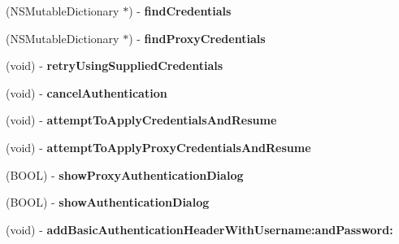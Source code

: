\begin{DoxyCompactItemize}
\item 
\hypertarget{interface_a_s_i_h_t_t_p_request_af337cbd50189506479260c6069ca2ded}{
(\-N\-S\-Mutable\-Dictionary $\ast$) -\/ {\bfseries find\-Credentials}}
\label{interface_a_s_i_h_t_t_p_request_af337cbd50189506479260c6069ca2ded}

\item 
\hypertarget{interface_a_s_i_h_t_t_p_request_aee0699cfb5ba5749a1461dfa56440121}{
(\-N\-S\-Mutable\-Dictionary $\ast$) -\/ {\bfseries find\-Proxy\-Credentials}}
\label{interface_a_s_i_h_t_t_p_request_aee0699cfb5ba5749a1461dfa56440121}

\item 
\hypertarget{interface_a_s_i_h_t_t_p_request_aad1efa3b1bc64006cc033bd0d4eee7cc}{
(void) -\/ {\bfseries retry\-Using\-Supplied\-Credentials}}
\label{interface_a_s_i_h_t_t_p_request_aad1efa3b1bc64006cc033bd0d4eee7cc}

\item 
\hypertarget{interface_a_s_i_h_t_t_p_request_a25d3d77f917c5f8b9956f6a45022dae2}{
(void) -\/ {\bfseries cancel\-Authentication}}
\label{interface_a_s_i_h_t_t_p_request_a25d3d77f917c5f8b9956f6a45022dae2}

\item 
\hypertarget{interface_a_s_i_h_t_t_p_request_ad3da0a488faf41101bbf73a8071456e8}{
(void) -\/ {\bfseries attempt\-To\-Apply\-Credentials\-And\-Resume}}
\label{interface_a_s_i_h_t_t_p_request_ad3da0a488faf41101bbf73a8071456e8}

\item 
\hypertarget{interface_a_s_i_h_t_t_p_request_a03ce363e92c2d5dbe7229f021b0230a5}{
(void) -\/ {\bfseries attempt\-To\-Apply\-Proxy\-Credentials\-And\-Resume}}
\label{interface_a_s_i_h_t_t_p_request_a03ce363e92c2d5dbe7229f021b0230a5}

\item 
\hypertarget{interface_a_s_i_h_t_t_p_request_ad9c4b7b0abc790e74806860c6d7a7a5b}{
(\-B\-O\-O\-L) -\/ {\bfseries show\-Proxy\-Authentication\-Dialog}}
\label{interface_a_s_i_h_t_t_p_request_ad9c4b7b0abc790e74806860c6d7a7a5b}

\item 
\hypertarget{interface_a_s_i_h_t_t_p_request_a64d812546f152b29ddd614938ffa5539}{
(\-B\-O\-O\-L) -\/ {\bfseries show\-Authentication\-Dialog}}
\label{interface_a_s_i_h_t_t_p_request_a64d812546f152b29ddd614938ffa5539}

\item 
\hypertarget{interface_a_s_i_h_t_t_p_request_a0295b7fbbc9af2be76f9dfe06f75f1ca}{
(void) -\/ {\bfseries add\-Basic\-Authentication\-Header\-With\-Username\-:and\-Password\-:}}
\label{interface_a_s_i_h_t_t_p_request_a0295b7fbbc9af2be76f9dfe06f75f1ca}


\end{DoxyCompactItemize}
